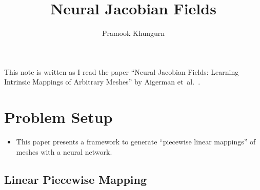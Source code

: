 \documentclass[10pt]{article}
\title{Neural Jacobian Fields}
\author{Pramook Khungurn}
\newcommand{\etal}{{et~al.}}
\begin{document}
\maketitle

This note is written as I read the paper ``Neural Jacobian Fields: Learning Intrinsic Mappings of Arbitrary Meshes'' by Aigerman \etal~\cite{Aigerman:2022}.

\section{Problem Setup}

\begin{itemize}
    \item This paper presents a framework to generate ``piecewise linear mappings'' of meshes with a neural network.    
\end{itemize}

\subsection{Linear Piecewise Mapping}
\end{document}

